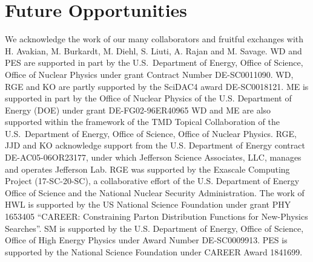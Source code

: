 \section{Future Opportunities}
\label{sec:future}



\begin{acknowledgement}
We acknowledge the work of our many collaborators and  fruitful exchanges with H. Avakian, M. Burkardt,
M. Diehl, S. Liuti, A. Rajan and M. Savage.
WD and PES are supported in part by the U.S.~Department of Energy,
Office of Science, Office of Nuclear Physics under grant Contract
Number DE-SC0011090. WD, RGE and KO are partly supported by the SciDAC4 award DE-SC0018121.
ME is supported in part by the Office of Nuclear Physics of the
U.S. Department of Energy (DOE) under grant DE-FG02-96ER40965
WD and ME  are also supported within the framework of the TMD Topical Collaboration of the U.S.~Department of Energy, Office of Science, Office of Nuclear Physics. 
RGE, JJD and KO acknowledge support from the U.S. Department of Energy
contract DE-AC05-06OR23177, under which Jefferson Science Associates,
LLC, manages and operates Jefferson Lab.
RGE was supported by the Exascale Computing Project (17-SC-20-SC), a collaborative effort of the U.S. Department of Energy Office of Science and the National Nuclear Security Administration.
The work of HWL  is supported by the US National Science Foundation under grant PHY 1653405 “CAREER: Constraining Parton Distribution Functions for New-Physics Searches”.
SM is supported by the U.S. Department of Energy, Office of Science, Office of High Energy Physics under Award Number DE-SC0009913.
PES is supported by the National Science Foundation under CAREER Award 1841699.  
\end{acknowledgement}






